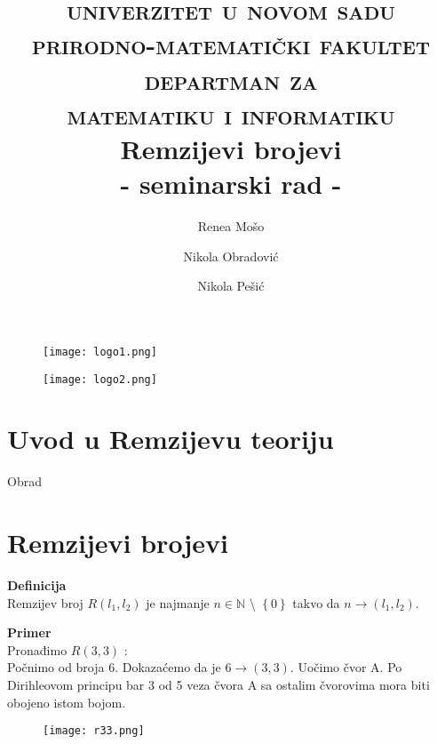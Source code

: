 \documentclass[12pt,a4paper]{article}
\title{\vspace{-2.3cm}\Large \textsc{univerzitet u novom sadu
\\prirodno-matematički fakultet
\\departman za
\\matematiku i informatiku}
\vspace{5em} 
\\ \textbf{Remzijevi brojevi}
\\ \large - seminarski rad -
\vspace{1em} }
\begin{document}
	\begin{figure}[]
	\centering
	\advance\leftskip-14cm
	\texttt{[image: logo1.png]}
	\end{figure}
	

	\begin{figure}[]
	\vspace{-3.4cm}
	\centering
	\advance{}
	\texttt{[image: logo2.png]}
	\end{figure}

	\author{
  	Renea Mošo\\
  	\texttt{}
  	\and
  	Nikola Obradović\\
  	\texttt{}
  	\and
  	Nikola Pešić
	}	
	\date{}
	
	
	\maketitle
	
	\thispagestyle{empty}
	
	\newpage
	
	
	\tableofcontents
	\newpage
	
	\section{Uvod u Remzijevu teoriju}
	Obrad
	\newpage
	
	
	\section{Remzijevi brojevi}
	\vspace{1em}
	{\fontsize{12pt}{12pt}\textbf{Definicija}}
	\vspace{0.5em}	
	\\
	Remzijev broj $R(l_{1}, l_{2})$ je najmanje $n \in \mathbb{N}$ \textbackslash {} $\left\lbrace 0\right\rbrace $ takvo da $n\rightarrow(l_{1}, l_{2})$.
	
	
	\vspace{1em}
	{\noindent\fontsize{12pt}{12pt}\textbf{Primer}}
	\vspace{0.5em}
	\\	
	Pronađimo $R(3,3)$ :
	\\Počnimo od broja 6. Dokazaćemo da je $6 \rightarrow (3, 3)$. Uočimo čvor A. Po Dirihleovom principu bar 3 od 5 veza čvora A sa ostalim čvorovima mora biti obojeno istom bojom. 
	\begin{figure}[h]
	\centering
	\texttt{[image: r33.png]}
	\end{figure}
	
\end{document}
